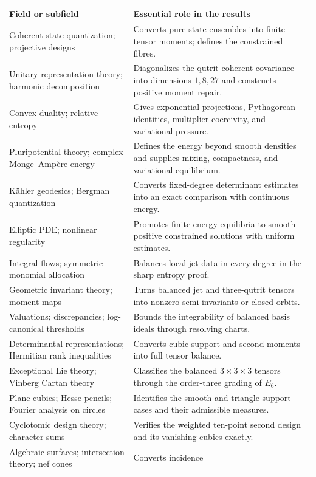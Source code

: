 {\small
\begin{longtable}{@{}p{.29\linewidth}p{.66\linewidth}@{}}
\toprule
Field or subfield & Essential role in the results\\
\midrule\endhead
Coherent-state quantization; projective designs & Converts pure-state
ensembles into finite tensor moments; defines the constrained fibres.\\
Unitary representation theory; harmonic decomposition & Diagonalizes
the qutrit coherent covariance into dimensions $1,8,27$ and constructs
positive moment repair.\\
Convex duality; relative entropy & Gives exponential projections,
Pythagorean identities, multiplier coercivity, and variational pressure.\\
Pluripotential theory; complex Monge--Amp\`ere energy & Defines the
energy beyond smooth densities and supplies mixing, compactness, and
variational equilibrium.\\
K\"ahler geodesics; Bergman quantization & Converts fixed-degree
determinant estimates into an exact comparison with continuous energy.\\
Elliptic PDE; nonlinear regularity & Promotes finite-energy equilibria
to smooth positive constrained solutions with uniform estimates.\\
Integral flows; symmetric monomial allocation & Balances local jet
data in every degree in the sharp entropy proof.\\
Geometric invariant theory; moment maps & Turns balanced jet and
three-qutrit tensors into nonzero semi-invariants or closed orbits.\\
Valuations; discrepancies; log-canonical thresholds & Bounds the
integrability of balanced basis ideals through resolving charts.\\
Determinantal representations; Hermitian rank inequalities & Converts
cubic support and second moments into full tensor balance.\\
Exceptional Lie theory; Vinberg Cartan theory & Classifies the balanced
$3\times3\times3$ tensors through the order-three grading of $E_6$.\\
Plane cubics; Hesse pencils; Fourier analysis on circles & Identifies
the smooth and triangle support cases and their admissible measures.\\
Cyclotomic design theory; character sums & Verifies the weighted
ten-point second design and its vanishing cubics exactly.\\
Algebraic surfaces; intersection theory; nef cones & Converts incidence

\end{longtable}}
